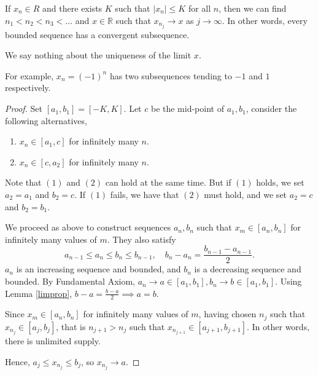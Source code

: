\leavevmode
\begin{theorem}
If \(x_n \in R\) and there exists \(K\) such that \(\left\vert x_n \right\vert \leq  K\) for all \(n\), then we can find \(n_1<n_2<n_3<\dots\) and \(x\in \mathbb{R}\) such that \(x_{n_j} \to x\) as \(j \to\infty\).
In other words, every bounded sequence has a convergent subsequence.
\end{theorem}
\begin{remark}
    We say nothing about the uniqueness of the limit \(x\).

    For example, \(x_n = (-1)^n\) has two subsequences tending to \(-1\) and \(1\) respectively.
\end{remark}
\begin{proof}
    Set \([a_1,b_1] = [-K,K]\). Let \(c\) be the mid-point of \(a_1, b_1\), consider the following alternatives,
    \begin{enumerate}
        \item \(x_n \in [a_1,c]\) for infinitely many \(n\).
        \item \(x_n \in [c,a_2]\) for infinitely many \(n\).
    \end{enumerate}
    Note that \((1)\) and \((2)\) can hold at the same time. But if \((1)\) holds, we set \(a_2 = a_1\) and \(b_2 = c\). If \((1)\) fails, we have that \((2)\) must hold, and we set \(a_2 = c\) and \(b_2 = b_1\).

    We proceed as above to construct sequences \(a_n, b_n\) such that \(x_m \in [a_n, b_n]\) for infinitely many values of \(m\). They also satisfy
    \[
        a_{n-1}\leq a_n\leq b_n\leq b_{n-1},\quad b_n - a_n = \frac{b_{n-1}-a_{n-1}}{2}.
    \]
    \(a_n\) is an increasing sequence and bounded, and \(b_n\) is a decreasing sequence and bounded. By Fundamental Axiom,
    \(a_n \to a \in [a_1,b_1], b_n \to b \in [a_1,b_1]\). Using Lemma \eqref{limprop}, \(b - a = \frac{b - a}{2}\implies a=b\).

    Since \(x_m \in [a_n, b_n]\) for infinitely many values of \(m\), having chosen \(n_j\) such that \(x_{n_j}\in [a_j,b_j]\), that is \(n_{j+1}>n_j\) such that \(x_{n_{j+1}} \in [a_{j+1},b_{j+1}]\). In other words, there is unlimited supply.

    Hence, \(a_j\leq x_{n_{j}}\leq b_j\), so \(x_{n_j}\to a\).
\end{proof}
